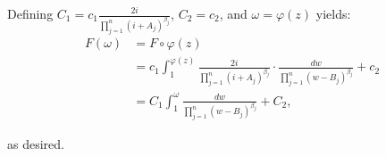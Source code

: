 \begin{solution}
  Defining $C_1 = c_1 \frac{2 i}{\prod_{j=1}^n (i + A_j)^{\beta_j}}$, $C_2 = c_2$, and $\omega = \varphi(z)$ yields:
  \begin{align*}
  F(\omega) &= F \circ \varphi(z) \\
            &= c_1 \int_1^{\varphi(z)} \frac{2 i }{\prod_{j=1}^n (i + A_j)^{\beta_j}} \cdot
                                       \frac{dw}{\prod_{j=1}^n \left( w - B_j \right)^{\beta_j}} + c_2 \\
            &= C_1 \int_1^{\omega} \frac{dw}{\prod_{j=1}^n \left( w - B_j \right)^{\beta_j}} + C_2,
  \end{align*}

  as desired. 
  \ \\
\end{solution}
